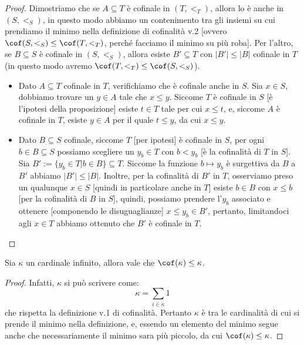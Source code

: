 \documentclass[11pt]{scrartcl}
\begin{document}
\begin{proof}
	Dimostriamo che se $A \subseteq T$ è cofinale in $(T,<_T)$, allora lo è anche in $(S,<_S)$, in questo modo abbiamo un contenimento tra gli insiemi su cui prendiamo il minimo nella definizione di cofinalità v.2 [ovvero $\cof(S,<_S) \leq \cof(T,<_T)$, perché facciamo il minimo su più roba]. Per 
	l'altro, se $B \subseteq S$ è cofinale in $(S,<_S)$, allora esiste $B' \subseteq T$ con $|B'| \leq |B|$ cofinale in $T$ (in questo modo avremo $\cof(T,<_T) \leq \cof(S,<_S)$).
	\begin{itemize}
		\item Dato $A \subseteq T$ cofinale in $T$, verifichiamo che è cofinale anche in $S$. Sia $x \in S$, dobbiamo trovare un $y \in A$ tale che $x \leq y$. Siccome $T$ è cofinale in $S$ [è l'ipotesi della proposizione] esiste $t \in T$ tale per cui $x \leq t$, e, siccome 
		$A$ è cofinale in $T$, esiste $y \in A$ per il quale $t \leq y$, da cui $x \leq y$.
		\item Dato $B \subseteq S$ cofinale, siccome $T$ [per ipotesi] è cofinale in $S$, per ogni $b \in B \subseteq S$ possiamo scegliere un $y_b \in T$ con $b < y_b$ [è la cofinalità di $T$ in $S$]. Sia $B' := \{y_b \in T | b \in B\} \subseteq T$.
		Siccome la funzione $b \mapsto y_b$ è surgettiva da $B$ a $B'$ abbiamo $|B'| \leq |B|$. Inoltre, per la cofinalità di $B'$ in $T$, osserviamo preso un qualunque $x \in S$ [quindi in particolare anche in $T$] esiste $b \in B$ con $x \leq b$ [per la cofinalità di $B$ in $S$],
		quindi, possiamo prendere l'$y_b$ associato e ottenere [componendo le disuguaglianze] $x \leq y_b \in B'$, pertanto, limitandoci agli $x \in T$ abbiamo ottenuto che $B'$ è cofinale in $T$.
	\end{itemize}
\end{proof}

\begin{proposition}
	Sia $\kappa$ un cardinale infinito, allora vale che $\cof(\kappa) \leq \kappa$.
\end{proposition}

\begin{proof}
	Infatti, $\kappa$ si può scrivere come:
	\[ \kappa = \sum_{i \in \kappa} 1
		\]
	che rispetta la definizione v.1 di cofinalità. Pertanto $\kappa$ è tra le cardinalità di cui si prende il minimo nella definizione, e, essendo un elemento
	del minimo segue anche che necessariamente il minimo sara più piccolo, da cui $\cof(\kappa) \leq \kappa$.
\end{proof}
\end{document}
